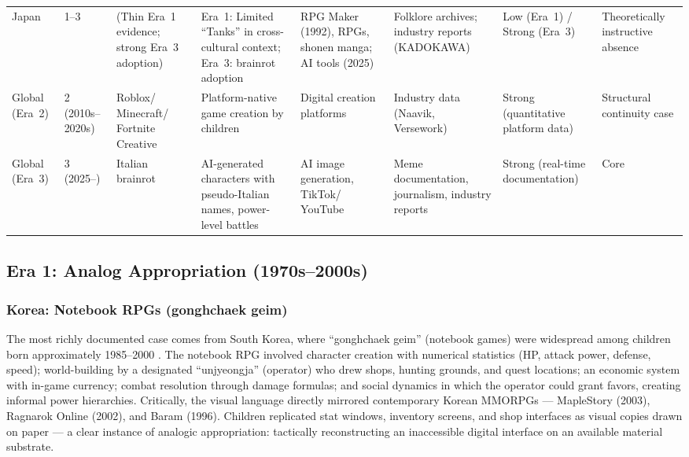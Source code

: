 \documentclass[12pt]{article}
\begin{document}
\begin{table}[htbp]
\begin{tabular}{@{}p{1.4cm}p{1.2cm}p{1.8cm}p{2.0cm}p{2.0cm}p{1.6cm}p{1.8cm}p{1.2cm}@{}}
Japan & 1--3 & (Thin Era~1 evidence; strong Era~3 adoption) & Era~1: Limited ``Tanks'' in cross-cultural context; Era~3: brainrot adoption & RPG Maker (1992), RPGs, shonen manga; AI tools (2025) & Folklore archives; industry reports (KADOKAWA) & Low (Era~1) / Strong (Era~3) & Theoretically instructive absence \\
\addlinespace
Global (Era~2) & 2 (2010s--2020s) & Roblox/ Minecraft/ Fortnite Creative & Platform-native game creation by children & Digital creation platforms & Industry data (Naavik, Versework) & Strong (quantitative platform data) & Structural continuity case \\
\addlinespace
Global (Era~3) & 3 (2025--) & Italian brainrot & AI-generated characters with pseudo-Italian names, power-level battles & AI image generation, TikTok/ YouTube & Meme documentation, journalism, industry reports & Strong (real-time documentation) & Core \\
\bottomrule
\end{tabular}
\end{table}

\subsection{Era 1: Analog Appropriation (1970s--2000s)}

\subsubsection{Korea: Notebook RPGs (gonghchaek geim)}

The most richly documented case comes from South Korea, where ``gonghchaek geim'' (notebook games) were widespread among children born approximately 1985--2000 \citep{namuwiki}. The notebook RPG involved character creation with numerical statistics (HP, attack power, defense, speed); world-building by a designated ``unjyeongja'' (operator) who drew shops, hunting grounds, and quest locations; an economic system with in-game currency; combat resolution through damage formulas; and social dynamics in which the operator could grant favors, creating informal power hierarchies. Critically, the visual language directly mirrored contemporary Korean MMORPGs --- MapleStory (2003), Ragnarok Online (2002), and Baram (1996). Children replicated stat windows, inventory screens, and shop interfaces as visual copies drawn on paper --- a clear instance of analogic appropriation: tactically reconstructing an inaccessible digital interface on an available material substrate.
\end{document}
